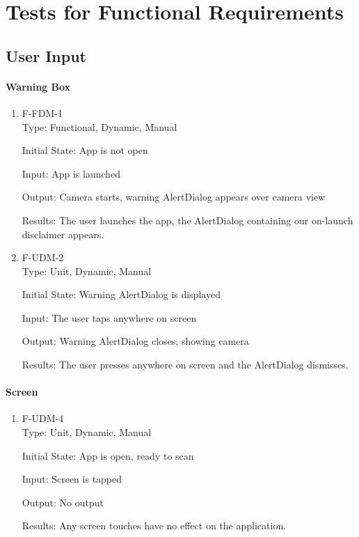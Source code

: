 \documentclass[12pt, titlepage]{article}
\begin{document}
\section{Tests for Functional Requirements}
\subsection{User Input}
\paragraph{Warning Box}
\begin{enumerate}
\item{F-FDM-1\\}
Type: Functional, Dynamic, Manual
					
Initial State: 
App is not open
					
Input: 
App is launched
					
Output: 
Camera starts, warning AlertDialog appears over camera view
					
Results: 
The user launches the app, the AlertDialog containing our on-launch disclaimer appears.

\item{F-UDM-2\\}
Type: Unit, Dynamic, Manual
					
Initial State: 
Warning AlertDialog is displayed
					
Input: 
The user taps anywhere on screen
					
Output: 
Warning AlertDialog closes, showing camera
					
Results:
The user presses anywhere on screen and the AlertDialog dismisses.

\end{enumerate}

\paragraph{Screen}
\begin{enumerate}
\item{F-UDM-4\\}
Type: Unit, Dynamic, Manual
					
Initial State: 
App is open, ready to scan
					
Input: 
Screen is tapped
					
Output: 
No output
					
Results: 
Any screen touches have no effect on the application.

\end{enumerate}
\end{document}
